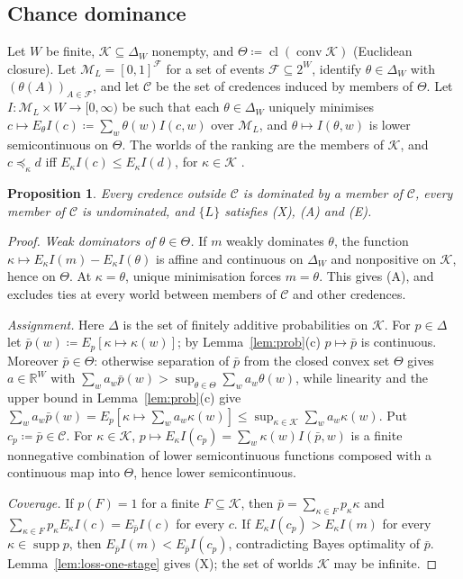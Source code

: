 \documentclass[11pt]{article}
\newtheorem{proposition}[theorem]{Proposition}
\theoremstyle{definition}
\theoremstyle{remark}
\newcommand{\M}{\mathcal M}
\newcommand{\C}{\mathcal C}
\newcommand{\supp}{\operatorname{supp}}
\newcommand{\cl}{\operatorname{cl}}
\begin{document}
\subsection{Chance dominance}

Let $W$ be finite, $\mathcal K\subseteq\Delta_W$ nonempty, and $\Theta\coloneqq\cl(\operatorname{conv}\mathcal K)$ (Euclidean closure). Let $\M_L=[0,1]^{\mathcal F}$ for a set of events $\mathcal F\subseteq2^W$, identify $\theta\in\Delta_W$ with $(\theta(A))_{A\in\mathcal F}$, and let $\C$ be the set of credences induced by members of $\Theta$. Let $I:\M_L\times W\to[0,\infty)$ be such that each $\theta\in\Delta_W$ uniquely minimises $c\mapsto E_\theta I(c)\coloneqq\sum_w\theta(w)I(c,w)$ over $\M_L$, and $\theta\mapsto I(\theta,w)$ is lower semicontinuous on $\Theta$. The worlds of the ranking are the members of $\mathcal K$, and $c\preceq_\kappa d$ iff $E_\kappa I(c)\le E_\kappa I(d)$, for $\kappa\in\mathcal K$ \cite[Chapter~10]{Pettigrew2016}.

\begin{proposition}\label{prop:chance}
Every credence outside $\C$ is dominated by a member of $\C$, every member of $\C$ is undominated, and $\{L\}$ satisfies (X), (A) and (E).
\end{proposition}
\begin{proof}
\emph{Weak dominators of $\theta\in\Theta$.} If $m$ weakly dominates $\theta$, the function $\kappa\mapsto E_\kappa I(m)-E_\kappa I(\theta)$ is affine and continuous on $\Delta_W$ and nonpositive on $\mathcal K$, hence on $\Theta$. At $\kappa=\theta$, unique minimisation forces $m=\theta$. This gives (A), and excludes ties at every world between members of $\C$ and other credences.

\emph{Assignment.} Here $\Delta$ is the set of finitely additive probabilities on $\mathcal K$. For $p\in\Delta$ let $\bar p(w)\coloneqq E_p[\kappa\mapsto\kappa(w)]$; by Lemma~\ref{lem:prob}(c) $p\mapsto\bar p$ is continuous. Moreover $\bar p\in\Theta$: otherwise separation of $\bar p$ from the closed convex set $\Theta$ gives $a\in\mathbb R^W$ with $\sum_wa_w\bar p(w)>\sup_{\theta\in\Theta}\sum_wa_w\theta(w)$, while linearity and the upper bound in Lemma~\ref{lem:prob}(c) give $\sum_wa_w\bar p(w)=E_p[\kappa\mapsto\sum_wa_w\kappa(w)]\le\sup_{\kappa\in\mathcal K}\sum_wa_w\kappa(w)$. Put $c_p\coloneqq\bar p\in\C$. For $\kappa\in\mathcal K$, $p\mapsto E_\kappa I(c_p)=\sum_w\kappa(w)I(\bar p,w)$ is a finite nonnegative combination of lower semicontinuous functions composed with a continuous map into $\Theta$, hence lower semicontinuous.

\emph{Coverage.} If $p(F)=1$ for a finite $F\subseteq\mathcal K$, then $\bar p=\sum_{\kappa\in F}p_\kappa\kappa$ and $\sum_{\kappa\in F}p_\kappa E_\kappa I(c)=E_{\bar p}I(c)$ for every $c$. If $E_\kappa I(c_p)>E_\kappa I(m)$ for every $\kappa\in\supp p$, then $E_{\bar p}I(m)<E_{\bar p}I(c_p)$, contradicting Bayes optimality of $\bar p$. Lemma~\ref{lem:loss-one-stage} gives (X); the set of worlds $\mathcal K$ may be infinite.
\end{proof}
\end{document}
